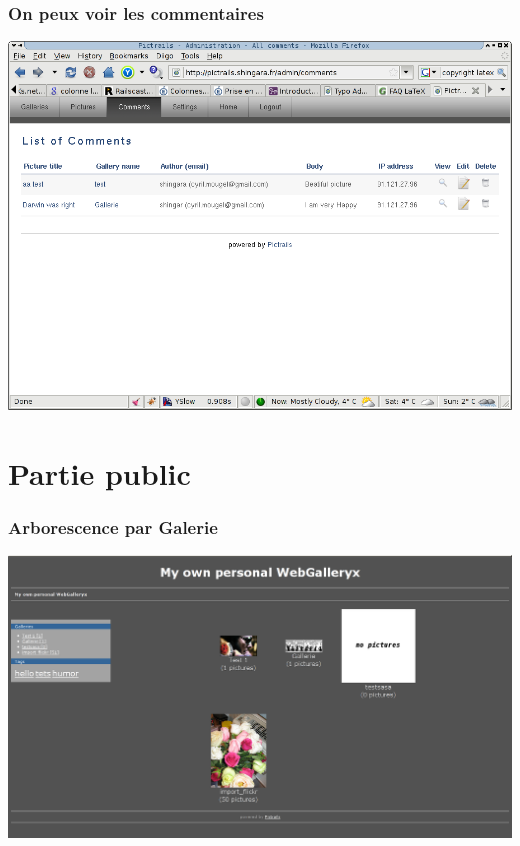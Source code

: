 \documentclass{beamer}
\begin{document}
\begin{frame}
    \frametitle{On peux voir les commentaires}
    \begin{center}
    \includegraphics[scale=.4]{see_comment.png}
    \end{center}
\end{frame}

\section{Partie public}
\begin{frame}
\end{frame}

\begin{frame}
  \frametitle{Arborescence par Galerie}
    \begin{center}
    \includegraphics[scale=.3]{arborescence_gallerie.png}
    \end{center}
\end{frame}
\end{document}
